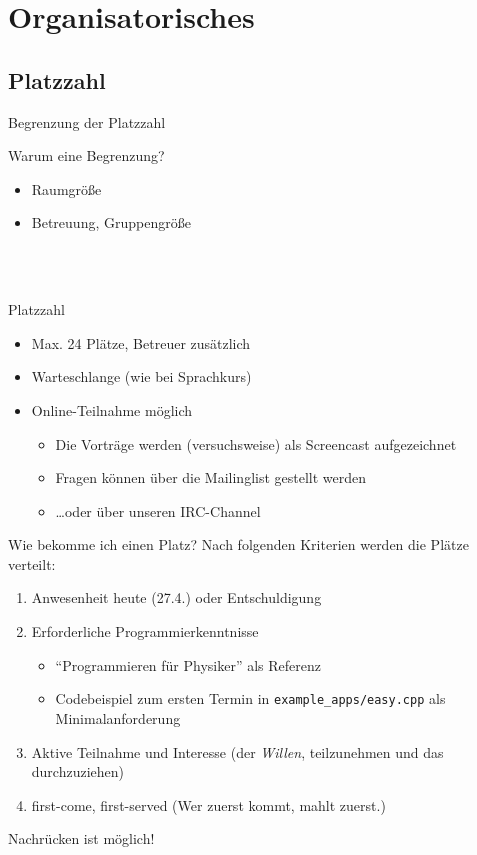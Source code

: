 \section{Organisatorisches}


\subsection{Platzzahl}

\begin{frame}{Begrenzung der Platzzahl}
	\begin{block}{Warum eine Begrenzung?}
		\begin{itemize}
			\item Raumgröße
			\item Betreuung, Gruppengröße
		\end{itemize}
	\end{block}
	\ \\
	\pause
	\ \\
	\begin{block}{Platzzahl}
		\begin{itemize}
			\item Max. 24 Plätze, Betreuer zusätzlich
			\item Warteschlange (wie bei Sprachkurs)
			\item Online-Teilnahme möglich
			\begin{itemize}
				\item Die Vorträge werden (versuchsweise) als Screencast aufgezeichnet
				\item Fragen können über die Mailinglist gestellt werden
				\item \dots oder über unseren IRC-Channel
			\end{itemize}
		\end{itemize}
	\end{block}
\end{frame}

\begin{frame}[fragile]{Wie bekomme ich einen Platz?}
	Nach folgenden Kriterien werden die Plätze verteilt:
	\begin{enumerate}
		\item Anwesenheit heute (27.4.) oder Entschuldigung
		\item Erforderliche Programmierkenntnisse
		\begin{itemize}
			\item \enquote{Programmieren für Physiker} als Referenz
			\item Codebeispiel zum ersten Termin in \verb|example_apps/easy.cpp| als Minimalanforderung
		\end{itemize}
		\item Aktive Teilnahme und Interesse (der \emph{Willen}, teilzunehmen und das durchzuziehen)
		\item first-come, first-served (Wer zuerst kommt, mahlt zuerst.)
	\end{enumerate}
	
	Nachrücken ist möglich!
\end{frame}



